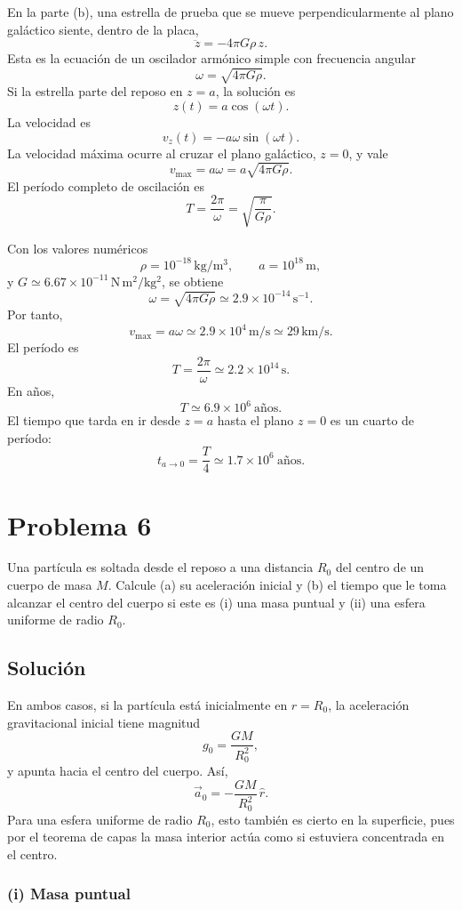 \documentclass[a4paper]{article}
\begin{document}
En la parte (b), una estrella de prueba que se mueve perpendicularmente al plano galáctico siente, dentro de la placa,
$$
\ddot z=-4\pi G\rho\,z.
$$
Esta es la ecuación de un oscilador armónico simple con frecuencia angular
$$
\omega=\sqrt{4\pi G\rho}.
$$
Si la estrella parte del reposo en $z=a$, la solución es
$$
z(t)=a\cos(\omega t).
$$
La velocidad es
$$
v_z(t)=-a\omega\sin(\omega t).
$$
La velocidad máxima ocurre al cruzar el plano galáctico, $z=0$, y vale
$$
v_{\max}=a\omega=a\sqrt{4\pi G\rho}.
$$
El período completo de oscilación es
$$
T=\frac{2\pi}{\omega}=\sqrt{\frac{\pi}{G\rho}}.
$$

Con los valores numéricos
$$
\rho=10^{-18}\,\mathrm{kg/m^3}, \qquad a=10^{18}\,\mathrm{m},
$$
y $G\simeq 6.67\times 10^{-11}\,\mathrm{N\,m^2/kg^2}$, se obtiene
$$
\omega=\sqrt{4\pi G\rho}\simeq 2.9\times 10^{-14}\,\mathrm{s^{-1}}.
$$
Por tanto,
$$
v_{\max}=a\omega\simeq 2.9\times 10^{4}\,\mathrm{m/s}\simeq 29\,\mathrm{km/s}.
$$
El período es
$$
T=\frac{2\pi}{\omega}\simeq 2.2\times 10^{14}\,\mathrm{s}.
$$
En años,
$$
T\simeq 6.9\times 10^6\ \text{años}.
$$
El tiempo que tarda en ir desde $z=a$ hasta el plano $z=0$ es un cuarto de período:
$$
t_{a\to 0}=\frac{T}{4}\simeq 1.7\times 10^6\ \text{años}.
$$


\section{Problema 6}

Una partícula es soltada desde el reposo a una distancia $R_0$ del centro de un cuerpo de masa $M$. Calcule
(a) su aceleración inicial y
(b) el tiempo que le toma alcanzar el centro del cuerpo si este es
(i) una masa puntual y
(ii) una esfera uniforme de radio $R_0$.



\subsection{Solución}

En ambos casos, si la partícula está inicialmente en $r=R_0$, la aceleración gravitacional inicial tiene magnitud
$$
g_0=\frac{GM}{R_0^2},
$$
y apunta hacia el centro del cuerpo. Así,
$$
\vec a_0=-\frac{GM}{R_0^2}\,\hat r.
$$
Para una esfera uniforme de radio $R_0$, esto también es cierto en la superficie, pues por el teorema de capas la masa interior actúa como si estuviera concentrada en el centro.

\subsubsection{(i) Masa puntual}
\end{document}
